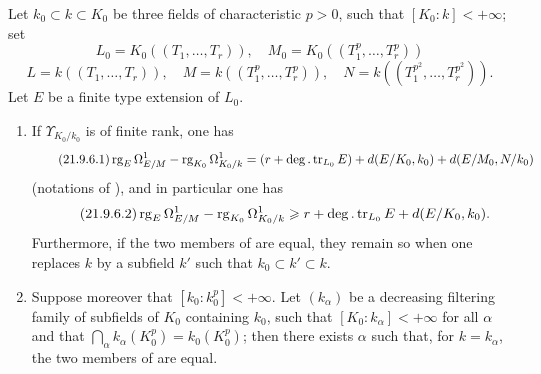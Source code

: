 \begin{proposition}[21.9.6]
\label{0.21.9.6}
Let $k_0\subset k\subset K_0$ be three fields of characteristic $p>0$, such that $[K_0:k]<+\infty$; set
\[
  L_0=K_0((T_1,\ldots,T_r)),\quad M_0=K_0((T_1^p,\ldots,T_r^p))
\]
\[
  L=k((T_1,\ldots,T_r)),\quad M=k((T_1^p,\ldots,T_r^p)),\quad N=k((T_1^{p^2},\ldots,T_r^{p^2})).
\]
Let $E$ be a finite type extension of $L_0$.
\begin{enumerate}
  \item[\rm (i)] If $\Upsilon_{K_0/k_0}$ is of finite rank, one has
  \begin{equation}
  \tag{21.9.6.1}
  \label{0.21.9.6.1}
    \operatorname{rg}_E\Omega^1_{E/M}-\operatorname{rg}_{K_0}\Omega^1_{K_0/k}=(r+\deg.\operatorname{tr}_{L_0} E)+d(E/K_0,k_0)+d(E/M_0,N/k_0)
  \end{equation}
  \textup{(}notations of \textup{)}, and in particular one has
  \begin{equation}
  \tag{21.9.6.2}
  \label{0.21.9.6.2}
    \operatorname{rg}_E\Omega^1_{E/M}-\operatorname{rg}_{K_0}\Omega^1_{K_0/k}\geqslant r+\deg.\operatorname{tr}_{L_0} E+d(E/K_0,k_0).
  \end{equation}
  Furthermore, if the two members of  are equal, they remain so when one replaces $k$ by a subfield $k'$ such that $k_0\subset k'\subset k$.
  \item[\rm \textup{(ii)}] Suppose moreover that $[k_0:k_0^p]<+\infty$.
  Let $(k_\alpha)$ be a decreasing filtering family of subfields of $K_0$ containing $k_0$, such that $[K_0:k_\alpha]<+\infty$ for all $\alpha$ and that $\bigcap_\alpha k_\alpha(K_0^p)=k_0(K_0^p)$; then there exists $\alpha$ such that, for $k=k_\alpha$, the two members of  are equal.
\end{enumerate}
\end{proposition}

